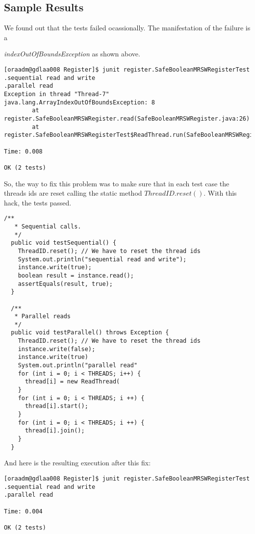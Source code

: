 \subsection{Sample Results}
\par
We found out that the tests failed ocassionally. The manifestation of the failure is a 
\par
\textit{indexOutOfBoundsException} as shown above.
\begin{verbatim}
[oraadm@gdlaa008 Register]$ junit register.SafeBooleanMRSWRegisterTest
.sequential read and write
.parallel read
Exception in thread "Thread-7" java.lang.ArrayIndexOutOfBoundsException: 8
        at register.SafeBooleanMRSWRegister.read(SafeBooleanMRSWRegister.java:26)
        at register.SafeBooleanMRSWRegisterTest$ReadThread.run(SafeBooleanMRSWRegisterTest.java:62)

Time: 0.008

OK (2 tests)
\end{verbatim}
\par
So, the way to fix this problem was to make sure that in each test case
the threads ids are reset calling the static method $ThreadID.reset()$. With
this hack, the tests passed.
\par
\begin{lstlisting}[style=numbers]
  /**
   * Sequential calls.
   */
  public void testSequential() {
    ThreadID.reset(); // We have to reset the thread ids
    System.out.println("sequential read and write");
    instance.write(true);
    boolean result = instance.read();
    assertEquals(result, true);
  }

  /**
   * Parallel reads
   */
  public void testParallel() throws Exception {
    ThreadID.reset(); // We have to reset the thread ids
    instance.write(false);
    instance.write(true)
    System.out.println("parallel read"
    for (int i = 0; i < THREADS; i++) {
      thread[i] = new ReadThread(
    }
    for (int i = 0; i < THREADS; i ++) {
      thread[i].start();
    }
    for (int i = 0; i < THREADS; i ++) {
      thread[i].join();
    }
  }  
\end{lstlisting}
\par
And here is the resulting execution after this fix:
\begin{verbatim}
[oraadm@gdlaa008 Register]$ junit register.SafeBooleanMRSWRegisterTest
.sequential read and write
.parallel read

Time: 0.004

OK (2 tests)
\end{verbatim}
\par

